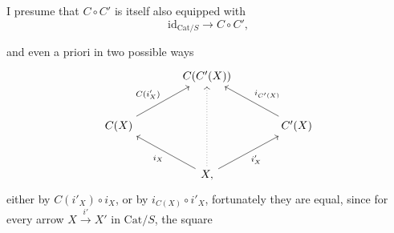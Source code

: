 \documentclass[11pt]{article}
\newcommand{\msp}[1]{\marginpar{\footnotesize [#1]}}
\newcommand{\Cat}{\mathrm{Cat}}
\begin{document}
I presume that $C \circ C'$ is itself also equipped with
\[
\mathrm{id}_{\Cat/S} \longrightarrow C \circ C',
\]

\msp{page 197}
and even a priori in two possible ways
\[
\begin{tikzcd}[column sep=large, row sep=large]
& C(C'(X)) & \\
C(X) \arrow[ur, "C(i'_X)"] & & C'(X) \arrow[ul, "i_{C'(X)}"'] \\
& X, \arrow[ul, "i_X"] \arrow[ur, "i'_X"'] \arrow[uu, dotted] &
\end{tikzcd}
\]
either by $C(i'_X) \circ i_X$, or by $i_{C(X)} \circ i'_X$, fortunately they are equal, since for every arrow $X \xrightarrow{\ i'\ } X'$ in $\Cat/S$, the square %
\end{document}
